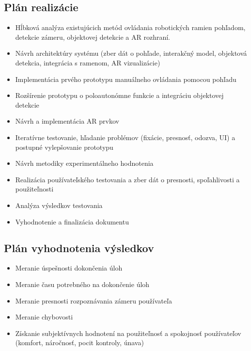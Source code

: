 \documentclass[11pt,english,a4paper]{article}
\begin{document}
        \subsection{Plán  realizácie}\label{sec:plan}
        \begin{itemize}
                \item  Hĺbková analýza existujúcich metód ovládania robotických ramien pohľadom, detekcie zámeru, objektovej detekcie a AR rozhraní.
                \item Návrh architektúry systému (zber dát o pohľade, interakčný model, objektová detekcia, integrácia s ramenom, AR vizualizácie)
                \item Implementácia prvého prototypu manuálneho ovládania pomocou pohľadu
                \item Rozšírenie prototypu o poloautonómne funkcie a integráciu objektovej detekcie
                \item Návrh a implementácia AR prvkov
                \item Iteratívne testovanie, hľadanie problémov (fixácie, presnosť, odozva, UI) a postupné vylepšovanie prototypu
                \item Návrh metodiky experimentálneho hodnotenia
                \item Realizácia používateľského testovania a zber dát o presnosti, spoľahlivosti a použiteľnosti
                \item  Analýza výsledkov testovania
                \item  Vyhodnotenie a finalizácia dokumentu
        \end{itemize}


        \subsection{Plán  vyhodnotenia  výsledkov}  \label{sec:eval}  
        \begin{itemize}
                \item  Meranie  úspešnosti  dokončenia  úloh
                \item  Meranie  času  potrebného  na  dokončenie  úloh
                \item  Meranie presnosti rozpoznávania zámeru používateľa
                \item  Meranie chybovosti
                \item  Získanie  subjektívnych hodnotení  na  použiteľnosť  a  spokojnosť používateľov  (komfort,  náročnosť,  pocit  kontroly,  únava)
        \end{itemize}
\end{document}
